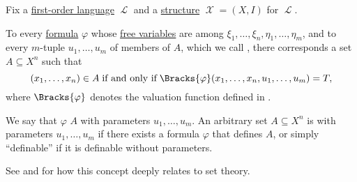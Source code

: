 \begin{definition}\label{def:first_order_definability}
  Fix a \hyperref[def:first_order_language]{first-order language} \( \mscrL \) and a \hyperref[def:first_order_structure]{structure} \( \mscrX = (X, I) \) for \( \mscrL \).

  To every \hyperref[def:first_order_syntax/formula]{formula} \( \varphi \) whose \hyperref[def:first_order_syntax/formula_free_variables]{free variables} are among \( \xi_1, \ldots, \xi_n, \eta_1, \ldots, \eta_m \), and to every \( m \)-tuple \( u_1, \ldots, u_m \) of members of \( A \), which we call , there corresponds a set \( A \subseteq X^n \) such that
  \begin{equation*}
    (x_1, \ldots, x_n) \in A \T{if and only if} \Bracks{\varphi}(x_1, \ldots, x_n, u_1, \ldots, u_m) = T,
  \end{equation*}
  where \( \Bracks{\varphi} \) denotes the valuation function defined in .

  We say that \( \varphi \)  \( A \) with parameters \( u_1, \ldots, u_m \). An arbitrary set \( A \subseteq X^n \) is  with parameters \( u_1, \ldots, u_m \) if there exists a formula \( \varphi \) that defines \( A \), or simply \enquote{definable} if it is definable without parameters.
\end{definition}
\begin{comments}
  \item See  and  for how this concept deeply relates to set theory.
\end{comments}

